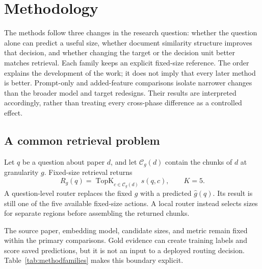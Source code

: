 \chapter{Methodology}
\label{ch:method}

The methods follow three changes in the research question: whether the
question alone can predict a useful size, whether document similarity
structure improves that decision, and whether changing the target or
the decision unit better matches retrieval. Each family keeps an
explicit fixed-size reference. The order explains the development of
the work; it does not imply that every later method is better.
Prompt-only and added-feature comparisons isolate narrower changes than
the broader model and target redesigns. Their results are interpreted
accordingly, rather than treating every cross-phase difference as a
controlled effect.

\section{A common retrieval problem}
Let $q$ be a question about paper $d$, and let $\mathcal{C}_g(d)$ contain
the chunks of $d$ at granularity $g$. Fixed-size retrieval returns
\begin{equation}
R_g(q)=\operatorname{TopK}_{c\in\mathcal{C}_g(d)}s(q,c),
\qquad K=5.
\end{equation}
A question-level router replaces the fixed $g$ with a predicted
$\hat g(q)$. Its result is still one of the five available fixed-size
actions. A local router instead selects sizes for separate regions
before assembling the returned chunks.

The source paper, embedding model, candidate sizes, and metric remain
fixed within the primary comparisons. Gold evidence can create
training labels and score saved predictions, but it is not an input
to a deployed routing decision. Table~\ref{tab:methodfamilies} makes
this boundary explicit.

